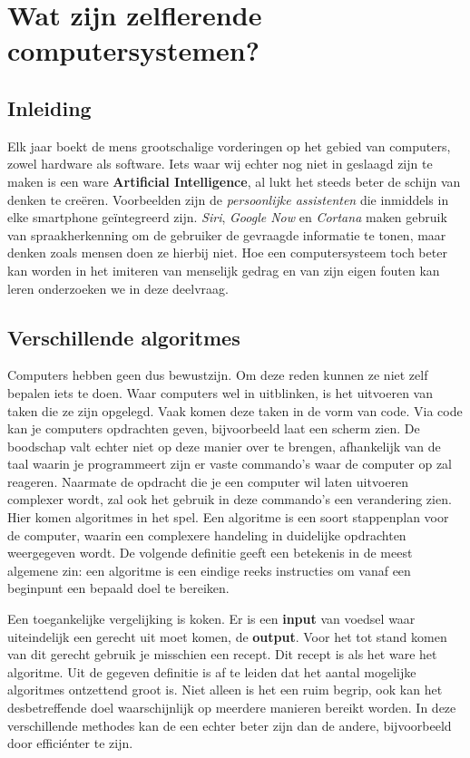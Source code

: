 \section{Wat zijn zelflerende computersystemen?}

\subsection{Inleiding}
Elk jaar boekt de mens grootschalige vorderingen op het gebied van computers, zowel hardware als software. Iets waar wij echter nog niet in geslaagd zijn te maken is een ware \textbf{ Artificial Intelligence}, al lukt het steeds beter de schijn van denken te creëren. Voorbeelden zijn de \textit{persoonlijke assistenten} die inmiddels in elke smartphone geïntegreerd zijn. \textit{Siri}, \textit{Google Now} en \textit{Cortana} maken gebruik van spraakherkenning om de gebruiker de gevraagde informatie te tonen, maar denken zoals mensen doen ze hierbij niet. Hoe een computersysteem toch beter kan worden in het imiteren van menselijk gedrag en van zijn eigen fouten kan leren onderzoeken we in deze deelvraag.


\subsection{Verschillende algoritmes}
Computers hebben geen dus bewustzijn. Om deze reden kunnen ze niet zelf bepalen iets te doen. Waar computers wel in uitblinken, is het uitvoeren van taken die ze zijn opgelegd. Vaak komen deze taken in de vorm van code. Via code kan je computers opdrachten geven, bijvoorbeeld laat een scherm zien. De boodschap valt echter niet op deze manier over te brengen, afhankelijk van de taal waarin je programmeert zijn er vaste commando's waar de computer op zal reageren.
Naarmate de opdracht die je een computer wil laten uitvoeren complexer wordt, zal ook het gebruik in deze commando's een verandering zien. Hier komen algoritmes in het spel. Een algoritme is een soort stappenplan voor de computer, waarin een complexere handeling in duidelijke opdrachten weergegeven wordt. De volgende definitie geeft een betekenis in de meest algemene zin: een algoritme is een eindige reeks instructies om vanaf een beginpunt een bepaald doel te bereiken.\cite{WoordenOrg}

Een toegankelijke vergelijking is koken. Er is een \textbf{input} van voedsel waar uiteindelijk een gerecht uit moet komen, de \textbf{output}. Voor het tot stand komen van dit gerecht gebruik je misschien een recept. Dit recept is als het ware het algoritme.
Uit de gegeven definitie is af te leiden dat het aantal mogelijke algoritmes ontzettend groot is. Niet alleen is het een ruim begrip, ook kan het desbetreffende doel waarschijnlijk op meerdere manieren bereikt worden. In deze verschillende methodes kan de een echter beter zijn dan de andere, bijvoorbeeld door effici\'enter te zijn.

